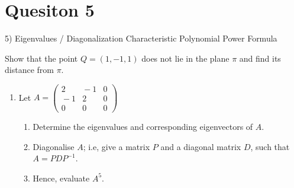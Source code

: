 \documentclass[12pt,a4paper]{article}
\begin{document}
\section*{Quesiton 5}
5) Eigenvalues / Diagonalization
Characteristic Polynomial
Power Formula


Show that the point $Q=(1,-1,1)$ does not lie in the plane $\pi$ and find its distance from $\pi$.

\begin{enumerate}
	\item Let $A=\displaystyle\left(\begin{array}{ccc} 
	2&\!\!\!-1&0\\
	\!\!\!-1& 2&0\\
	0& 0& 0\end{array}\right)$
	
	\begin{enumerate}
		\medskip\item Determine the eigenvalues and corresponding eigenvectors of $A$.
		
		\medskip\item Diagonalise $A$; i.e, give a matrix $P$ and a diagonal matrix $D$, such that $A=PDP^{-1}$.
		
		\medskip \item Hence, evaluate $A^5$.
	\end{enumerate}\vspace{0.4cm}
	
\end{enumerate}
\end{document}
